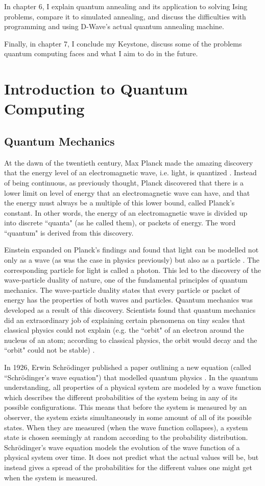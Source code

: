 \documentclass[11pt]{report}
\newcommand{\?}{\stackrel{?}{=}}
\begin{document}
In chapter 6, I explain quantum annealing and its application to solving Ising problems, compare it to simulated annealing, and discuss the difficulties with programming and using D-Wave's actual quantum annealing machine.

Finally, in chapter 7, I conclude my Keystone, discuss some of the problems quantum computing faces and what I aim to do in the future.

\chapter{Introduction to Quantum Computing}

\section{Quantum Mechanics}
At the dawn of the twentieth century, Max Planck made the amazing discovery that the energy level of an electromagnetic wave, i.e. light, is quantized \cite{meh01}. Instead of being continuous, as previously thought, Planck discovered that there is a lower limit on level of energy that an electromagnetic wave can have, and that the energy must always be a multiple of this lower bound, called Planck's constant. In other words, the energy of an electromagnetic wave is divided up into discrete ``quanta" (as he called them), or packets of energy. The word ``quantum" is derived from this discovery.

Einstein expanded on Planck’s findings and found that light can be modelled not only as a wave (as was the case in physics previously) but also as a particle \cite{ein05}. The corresponding particle for light is called a photon. This led to the discovery of the wave-particle duality of nature, one of the fundamental principles of quantum mechanics. The wave-particle duality states that every particle or packet of energy has the properties of both waves and particles. Quantum mechanics was developed as a result of this discovery. Scientists found that quantum mechanics did an extraordinary job of explaining certain phenomena on tiny scales that classical physics could not explain (e.g. the ``orbit" of an electron around the nucleus of an atom; according to classical physics, the orbit would decay and the ``orbit" could not be stable) \cite{smi15}.

In 1926, Erwin Schrödinger published a paper outlining a new equation (called ``Schrödinger’s wave equation") that modelled quantum physics \cite{schr26}. In the quantum understanding, all properties of a physical system are modeled by a wave function which describes the different probabilities of the system being in any of its possible configurations. This means that before the system is measured by an observer, the system exists simultaneously in some amount of all of its possible states. When they are measured (when the wave function collapses), a system state is chosen seemingly at random according to the probability distribution. Schrödinger's wave equation models the evolution of the wave function of a physical system over time. It does not predict what the actual values will be, but instead gives a spread of the probabilities for the different values one might get when the system is measured.
\end{document}
